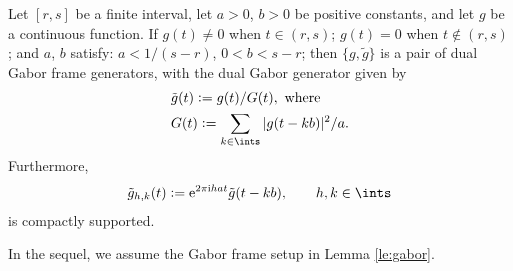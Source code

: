 \documentclass[a4paper, 12pt,preprint]{article}
\renewcommand{\i}{\mathrm{i}}
\newcommand{\sumi}{\ensuremath{\sum_{k \in \ints}}\xspace}
\newcommand{\tg}{\ensuremath{\tilde{g}}\xspace}
\newcommand{\hkints}{\ensuremath{h,k \in \ints}\xspace}
\newcommand{\modc}[2]{\ensuremath{{\bar{\omega}}({#1},#2)}\xspace}
\begin{document}
\begin{lem}\label{le:gabor}
  Let $[r,s]$ be a finite interval,  let $a> 0$, $b > 0$  be positive constants,  and let $g$ be a continuous function. If $g(t) \ne 0$ when $t \in (r,s)$; $g(t) = 0$ when $t \notin (r,s)$;  and  $a$, $b$ satisfy: $a < 1/(s-r)$, $0<b<s-r$; then  $\{g,\tilde{g}\}$ is a pair of dual Gabor frame generators, with the dual Gabor generator given by  
\begin{align}
  &\tilde{g}(t)  :=  g(t)/G(t), \text{ where} \label{eq:dualg}\\
  &G(t) := \sumi|g(t-kb)|^2/a.\label{eq:capg}
\end{align}
Furthermore, 
\begin{align}
  \tilde{g}_{h,k}(t) := \mathrm{e}^{2\pi\i h a t} \tilde{g}(t - kb), \qquad  h, k \in \ints \label{eq:dualghk}
\end{align}
is compactly supported.   
\end{lem}
\begin{comment}
\noindent Next, we state here and prove in the Appendix that the dual generator \tg  inherits the continuity properties of $g$.
\begin{lem} \label{lem:modtg}
  Let the dual Gabor frame generator $\tilde{g}$ be constructed as in \eqref{eq:dualg}. If $\modc{g}{\delta}$ denotes the modulus of continuity of $g$, i.e. $\modc{g}{\delta} := \sup \{|g(t) - g(t')| : t,t' \in \real \text{ and } |t -t'| < \delta\}$,  then   
  \begin{align}
    \modc{\tilde{g}_{j,k}}{\delta} \le C \modc{g}{\delta} \qquad  \hkints\notag,
    \label{}
  \end{align}
  where $C$ is a positive constant.
\end{lem}
\begin{proof}
  See Appendix \ref{ap:proof}.
\end{proof}
\end{comment}
\noindent In the sequel,  we assume the Gabor frame setup in Lemma \ref{le:gabor}.
\end{document}
